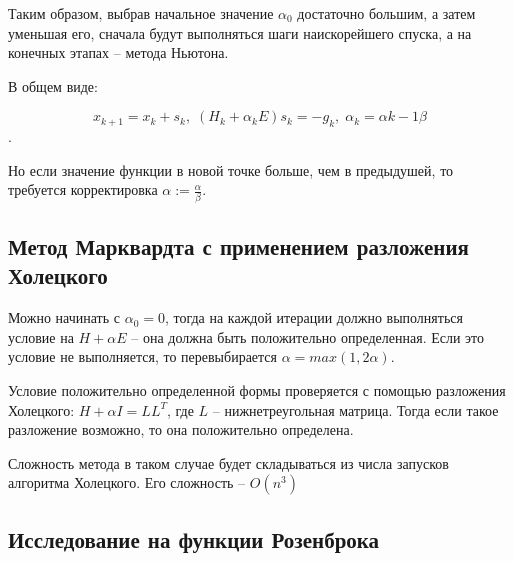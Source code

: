 \documentclass[12pt]{article}
\begin{document}
Таким образом, выбрав начальное значение $\alpha_0$ достаточно большим, а затем уменьшая его, сначала будут выполняться шаги наискорейшего спуска, а на конечных этапах -- метода Ньютона.

В общем виде:

\[ x_{k+1} = x_k + s_k, \; \left( H_k + \alpha_k E \right) s_k = -g_k, \; \alpha_k = \alpha{k-1} \beta \].

Но если значение функции в новой точке больше, чем в предыдушей, то требуется корректировка $\alpha := \frac{\alpha}{\beta}$.

\subsection{Метод Марквардта с применением разложения Холецкого}

Можно начинать с $\alpha_0 = 0$, тогда на каждой итерации должно выполняться условие на $ H+\alpha E$ -- она должна быть положительно определенная. Если это условие не выполняется, то перевыбирается $\alpha = max \left( 1, 2\alpha \right)$.

Условие положительно определенной формы проверяется с помощью разложения Холецкого: $H+\alpha I = LL^T$, где $L$ -- нижнетреугольная матрица. Тогда если такое разложение возможно, то она положительно определена.

Сложность метода в таком случае будет складываться из числа запусков алгоритма Холецкого. Его сложность -- $O(n^3)$

\subsection{Исследование на функции Розенброка}
\end{document}
